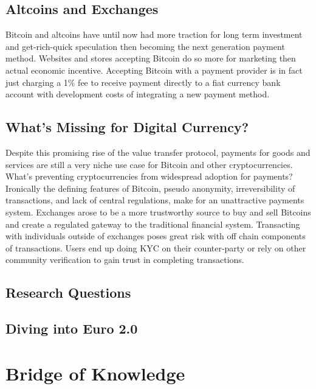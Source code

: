 \documentclass[12pt]{article} %
\begin{document}
\subsection{Altcoins and Exchanges}
Bitcoin and altcoins have until now had more traction for long term investment and get-rich-quick speculation then becoming the next generation payment method. Websites and stores accepting Bitcoin do so more for marketing then actual economic incentive.  Accepting Bitcoin with a payment provider is in fact just charging a 1\% fee to receive payment directly to a fiat currency bank account with development costs of integrating a new payment method. 

\subsection{What's Missing for Digital Currency?}
Despite this promising rise of the value transfer protocol, payments for goods and services are still a very niche use case for Bitcoin and other cryptocurrencies.  What's preventing cryptocurrencies from widespread adoption for payments? Ironically the defining features of Bitcoin, pseudo anonymity, irreversibility of transactions, and lack of central regulations, make for an unattractive payments system.  Exchanges arose to be a more trustworthy source to buy and sell Bitcoins and create a regulated gateway to the traditional financial system. Transacting with individuals outside of exchanges poses great risk with off chain components of transactions. Users end up doing KYC on their counter-party or rely on other community verification to gain trust in completing transactions.

\subsection{Research Questions}

\subsection{Diving into Euro 2.0}

\pagebreak

\section{Bridge of Knowledge}
\label{Bridge of Knowledge}
\end{document}
